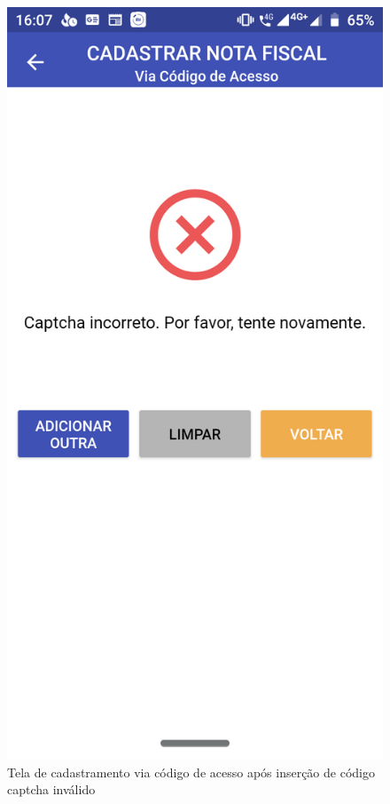 \newpage
\begin{figure}[h]
    \centering
    \includegraphics[scale=0.15]{tcc/figures/app/app_codigo_acesso_erro_captcha.png}
    \caption{Tela de cadastramento via código de acesso após inserção de código captcha inválido}
    \label{appCodigoAcessoErroCaptchaFig}
\end{figure}

